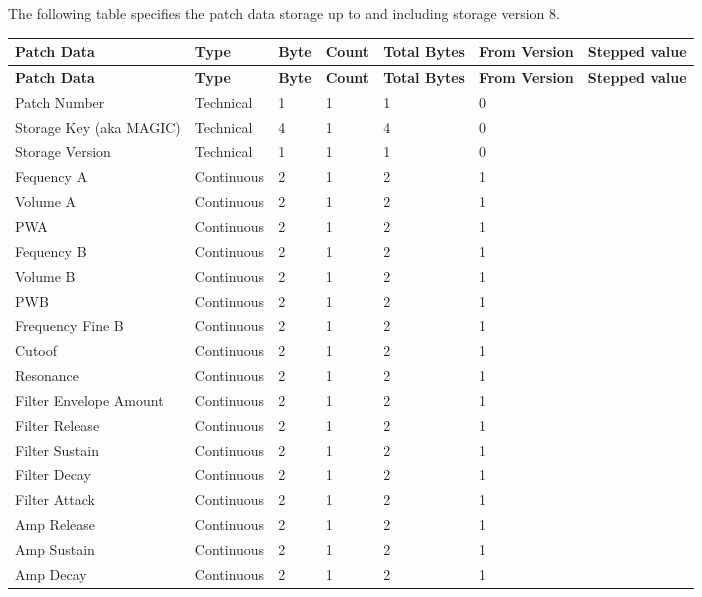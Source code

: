 The following table specifies the patch data storage up to and including storage version 8. 

\footnotesize
\renewcommand{\arraystretch}{1.3}

\begin{longtable}[l]{p{5cm}|p{2cm}|p{1.5cm}|p{1.5cm}|p{2cm}|p{2.2cm}|p{5cm}} 
\textbf{Patch Data} & \textbf{Type} & \textbf{Byte} & \textbf{Count} & \textbf{Total Bytes} & \textbf{From Version} & \textbf{Stepped value} \\ \hline
\endfirsthead
\textbf{Patch Data} & \textbf{Type} & \textbf{Byte} & \textbf{Count} & \textbf{Total Bytes} & \textbf{From Version} & \textbf{Stepped value} \\ \hline
\endhead 
Patch Number & Technical & 1 & 1 & 1 & 0 &  \\ \hline
Storage Key (aka MAGIC) & Technical & 4 & 1 & 4 & 0 &  \\ \hline
Storage Version & Technical & 1 & 1 & 1 & 0 &  \\ \hline
Fequency A & Continuous & 2 & 1 & 2 & 1 &  \\ \hline
Volume A & Continuous & 2 & 1 & 2 & 1 &  \\ \hline
PWA & Continuous & 2 & 1 & 2 & 1 &  \\ \hline
Fequency B & Continuous & 2 & 1 & 2 & 1 &  \\ \hline
Volume B & Continuous & 2 & 1 & 2 & 1 &  \\ \hline
PWB & Continuous & 2 & 1 & 2 & 1 &  \\ \hline
Frequency Fine B & Continuous & 2 & 1 & 2 & 1 &  \\ \hline
Cutoof & Continuous & 2 & 1 & 2 & 1 &  \\ \hline
Resonance & Continuous & 2 & 1 & 2 & 1 &  \\ \hline
Filter Envelope Amount & Continuous & 2 & 1 & 2 & 1 &  \\ \hline
Filter Release & Continuous & 2 & 1 & 2 & 1 &  \\ \hline
Filter Sustain & Continuous & 2 & 1 & 2 & 1 &  \\ \hline
Filter Decay & Continuous & 2 & 1 & 2 & 1 &  \\ \hline
Filter Attack & Continuous & 2 & 1 & 2 & 1 &  \\ \hline
Amp Release & Continuous & 2 & 1 & 2 & 1 &  \\ \hline
Amp Sustain & Continuous & 2 & 1 & 2 & 1 &  \\ \hline
Amp Decay & Continuous & 2 & 1 & 2 & 1 &  \\ \hline

\end{longtable}
